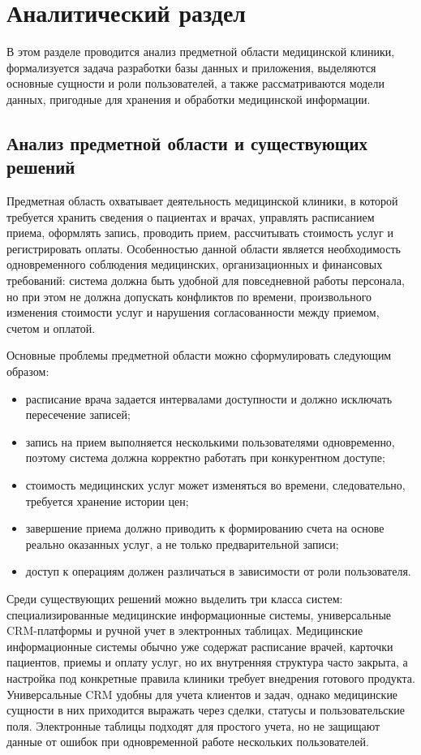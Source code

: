\chapter{Аналитический раздел}

В этом разделе проводится анализ предметной области медицинской клиники, формализуется задача разработки базы данных и приложения, выделяются основные сущности и роли пользователей, а также рассматриваются модели данных, пригодные для хранения и обработки медицинской информации.

\section{Анализ предметной области и существующих решений}

Предметная область охватывает деятельность медицинской клиники, в которой требуется хранить сведения о пациентах и врачах, управлять расписанием приема, оформлять запись, проводить прием, рассчитывать стоимость услуг и регистрировать оплаты. Особенностью данной области является необходимость одновременного соблюдения медицинских, организационных и финансовых требований: система должна быть удобной для повседневной работы персонала, но при этом не должна допускать конфликтов по времени, произвольного изменения стоимости услуг и нарушения согласованности между приемом, счетом и оплатой.

Основные проблемы предметной области можно сформулировать следующим образом:
\begin{itemize}
    \item расписание врача задается интервалами доступности и должно исключать пересечение записей;
    \item запись на прием выполняется несколькими пользователями одновременно, поэтому система должна корректно работать при конкурентном доступе;
    \item стоимость медицинских услуг может изменяться во времени, следовательно, требуется хранение истории цен;
    \item завершение приема должно приводить к формированию счета на основе реально оказанных услуг, а не только предварительной записи;
    \item доступ к операциям должен различаться в зависимости от роли пользователя.
\end{itemize}

Среди существующих решений можно выделить три класса систем: специализированные медицинские информационные системы, универсальные CRM-платформы и ручной учет в электронных таблицах. Медицинские информационные системы обычно уже содержат расписание врачей, карточки пациентов, приемы и оплату услуг, но их внутренняя структура часто закрыта, а настройка под конкретные правила клиники требует внедрения готового продукта. Универсальные CRM удобны для учета клиентов и задач, однако медицинские сущности в них приходится выражать через сделки, статусы и пользовательские поля. Электронные таблицы подходят для простого учета, но не защищают данные от ошибок при одновременной работе нескольких пользователей.

